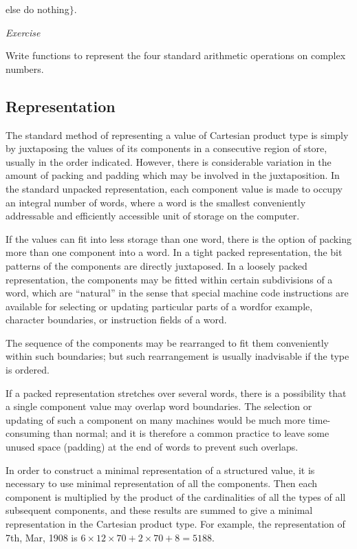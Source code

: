 \documentclass[twoside,11pt]{book}
\begin{document}
\quad \quad \quad else do nothing$\}$.

\noindent
\textit{Exercise}
\nopagebreak

\noindent
Write functions to represent the four standard arithmetic operations on complex numbers.

\subsection{Representation}
\label{sec:representation-4-2}

The standard method of representing a value of Cartesian product type is simply by juxtaposing the values of its components in a consecutive region of store, usually in the order indicated. However, there is considerable variation in the amount of packing and padding which may be involved in the juxtaposition. In the standard unpacked representation, each component value is made to occupy an integral number of words, where a word is the smallest conveniently addressable and efficiently accessible unit of storage on the computer.

If the values can fit into less storage than one word, there is the option of packing more than one component into a word. In a tight packed representation, the bit patterns of the components are directly juxtaposed. In a loosely packed representation, the components may be fitted within certain subdivisions of a word, which are ``natural'' in the sense that special machine code instructions are available for selecting or updating particular parts of a word\textemdash{}for example, character boundaries, or instruction fields of a word.

The sequence of the components may be rearranged to fit them conveniently within such boundaries; but such rearrangement is usually inadvisable if the type is ordered.

If a packed representation stretches over several words, there is a possibility that a single component value may overlap word boundaries. The selection or updating of such a component on many machines would be much more time-consuming than normal; and it is therefore a common practice to leave some unused space (padding) at the end of words to prevent such overlaps.

In order to construct a minimal representation of a structured value, it is necessary to use minimal representation of all the components. Then each component is multiplied by the product of the cardinalities of all the types of all subsequent components, and these results are summed to give a minimal representation in the Cartesian product type. For example, the representation of 7th, Mar, 1908 is $6\times 12\times 70 + 2\times 70 + 8 = 5188$.
\end{document}
